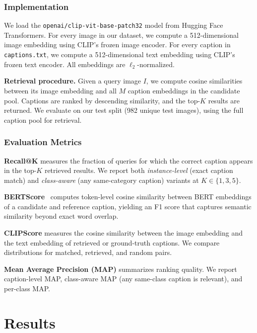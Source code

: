 \documentclass{article}
\begin{document}
\subsubsection{Implementation}

We load the \texttt{openai/clip-vit-base-patch32} model from Hugging Face Transformers. For every image in our dataset, we compute a 512-dimensional image embedding using CLIP's frozen image encoder. For every caption in \texttt{captions.txt}, we compute a 512-dimensional text embedding using CLIP's frozen text encoder. All embeddings are $\ell_2$-normalized.

\textbf{Retrieval procedure.} Given a query image $I$, we compute cosine similarities between its image embedding and all $M$ caption embeddings in the candidate pool. Captions are ranked by descending similarity, and the top-$K$ results are returned. We evaluate on our test split (982 unique test images), using the full caption pool for retrieval.

\subsubsection{Evaluation Metrics}
\label{sec:eval_metrics}

\textbf{Recall@K} measures the fraction of queries for which the correct caption appears in the top-$K$ retrieved results. We report both \emph{instance-level} (exact caption match) and \emph{class-aware} (any same-category caption) variants at $K \in \{1, 3, 5\}$.

\textbf{BERTScore}~\cite{zhang2020bertscore} computes token-level cosine similarity between BERT embeddings of a candidate and reference caption, yielding an F1 score that captures semantic similarity beyond exact word overlap.

\textbf{CLIPScore} measures the cosine similarity between the image embedding and the text embedding of retrieved or ground-truth captions. We compare distributions for matched, retrieved, and random pairs.

\textbf{Mean Average Precision (MAP)} summarizes ranking quality. We report caption-level MAP, class-aware MAP (any same-class caption is relevant), and per-class MAP.

\section{Results}
\label{sec:results}
\end{document}
